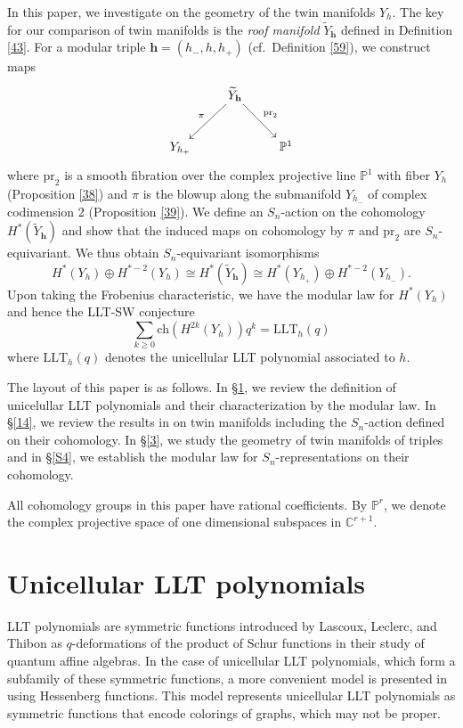 \documentclass[11pt]{article}
\theoremstyle{definition}
\numberwithin{equation}{section}
\numberwithin{equation}{section}
\newcommand{\PP}{\mathbb{P}}
\newcommand\CC{\mathbb{C}}
\newcommand\tY{{\widetilde{Y}}}
\newcommand\ch{\mathrm{ch} }
\newcommand\LLT{\mathrm{LLT}}
\newcommand\pr{\mathrm{pr}}
\newcommand\bh{\mathbf{h}}
\begin{document}
In this paper, we investigate on the geometry of the twin manifolds $Y_h$. 
The key for our comparison of twin manifolds is the \emph{roof manifold} $\tY_\bh$ defined in Definition \ref{43}. For a modular triple $\bh=(h_-,h,h_+)$ (cf.~Definition \ref{59}), we construct maps
$$\xymatrix{&\tY_\bh \ar[ld]_-{\pi}\ar[rd]^-{\pr_2}& \\ Y_{h_+}&&\PP^1}$$
where $\pr_2$ is a smooth fibration over the complex projective line $\PP^1$ with fiber $Y_h$ (Proposition \ref{38}) and $\pi$ is the blowup along the submanifold $Y_{h_-}$ of complex codimension 2 (Proposition \ref{39}). 
We define an $S_n$-action on the cohomology $H^*(\tY_\bh)$ and show that 
the induced maps on cohomology by $\pi$ and $\pr_2$ are $S_n$-equivariant. 
We thus obtain  $S_n$-equivariant isomorphisms
\[H^*(Y_h)\oplus H^{*-2}(Y_h)\cong H^*(\tY_\bh)\cong 
H^*(Y_{h_+})\oplus H^{*-2}(Y_{h_-}).\]
Upon taking the Frobenius characteristic, we have the modular law for $H^*(Y_h)$ and hence the LLT-SW conjecture
$$\sum_{k\ge 0}\ch (H^{2k}(Y_h)) q^k = \LLT_h(q)$$ 
where $\LLT_h(q)$ denotes the unicellular LLT polynomial associated to $h$.


The layout of this paper is as follows. 
In \S\ref{4}, we review the definition of unicelullar LLT polynomials and their characterization by the modular law.
In \S\ref{14}, we review the results in \cite{AB} on twin manifolds including the $S_n$-action defined on their cohomology. 
In \S\ref{3}, we study the geometry of twin manifolds of triples and in \S\ref{S4}, we establish the modular law for $S_n$-representations on their cohomology. 

All cohomology groups in this paper have rational coefficients. By $\PP^r$, we denote the complex projective space of one dimensional subspaces in $\CC^{r+1}$.

\section{Unicellular LLT polynomials}\label{4}

LLT polynomials are symmetric functions introduced by Lascoux, Leclerc, and Thibon \cite{LLT} as $q$-deformations of the product of Schur functions in their study of quantum affine algebras.  In the case of unicellular LLT polynomials, which form a subfamily of these symmetric functions, a more convenient model is presented in \cite{CM} using Hessenberg functions. This model represents unicellular LLT polynomials as symmetric functions that encode colorings of graphs, which may not be proper.
\end{document}
